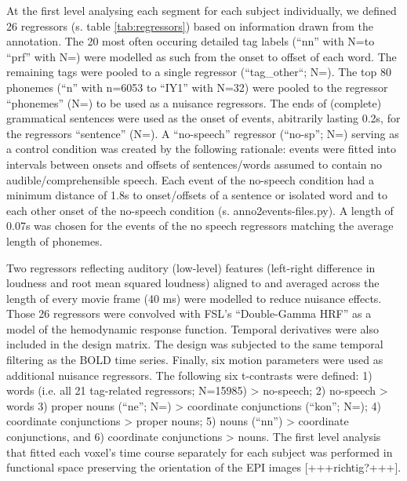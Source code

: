 \documentclass[10pt,a4paper,onecolumn]{article}
\begin{document}
At the first level analysing each segment for each subject individually, we defined 26 regressors (s. table \ref{tab:regressors}) based on information drawn from the annotation.
The 20 most often occuring detailed tag labels (``nn'' with N=\rNnAll\space to ``prf'' with N=\rPrfAll) were modelled as such from the onset to offset of each word. The remaining tags were pooled to a single regressor (``tag\_other``; N=\rTagotherAll).
The top 80 phonemes (``n'' with n=6053 to ``IY1'' with N=32) were pooled to the regressor ``phonemes'' (N=\rPhonesAll) to be used as a nuisance regressors.
The ends of (complete) grammatical sentences were used as the onset of events, abitrarily lasting 0.2s, for the regressors ``sentence'' (N=\rSentenceAll).
A ``no-speech'' regressor (``no-sp''; N=\rNospAll) serving as a control condition was created by the following rationale: events were fitted into intervals between onsets and offsets of sentences/words assumed to contain no audible/comprehensible speech.
Each event of the no-speech condition had a minimum distance of 1.8s to onset/offsets of a sentence or isolated word and to each other onset of the no-speech condition (s. anno2events-files.py).
A length of 0.07s was chosen for the events of the no speech regressors  matching the average length of phonemes.

Two regressors reflecting auditory (low-level) features (left-right difference in loudness and root mean squared loudness) aligned to and averaged across the length of every movie frame (40 ms) were modelled to reduce nuisance effects.
Those 26 regressors were convolved with FSL's ``Double-Gamma HRF'' as a model of the hemodynamic response function.
Temporal derivatives were also included in the design matrix.
The design was subjected to the same temporal filtering as the BOLD time series. Finally, six motion parameters were used as additional nuisance regressors.
The following six t-contrasts were defined:
1) words (i.e. all 21 tag-related regressors; N=15985) > no-speech;
2) no-speech > words 3) proper nouns (``ne''; N=\rNeAll) > coordinate conjunctions (``kon''; N=\rKonAll);
4) coordinate conjunctions > proper nouns;
5) nouns (``nn'') > coordinate conjunctions, and
6) coordinate conjunctions > nouns.
The first level analysis that fitted each voxel's time course separately for each subject was performed in functional space preserving the orientation of the EPI images [+++richtig?+++].
\end{document}

